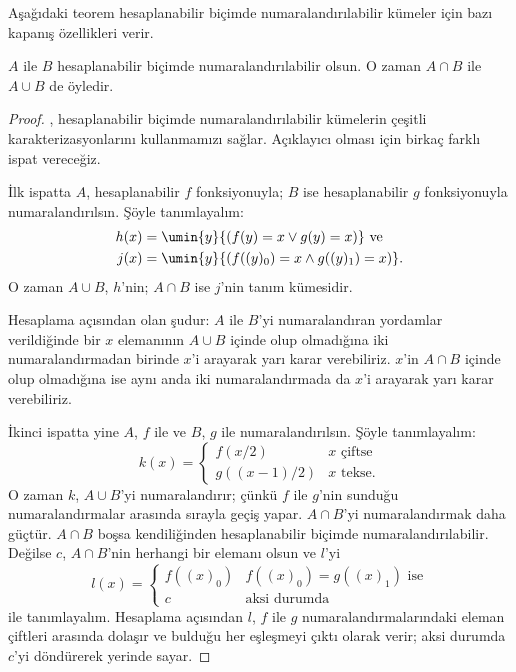 \documentclass[../../../include/open-logic-section]{subfiles}
\begin{document}


Aşağıdaki teorem hesaplanabilir biçimde numaralandırılabilir kümeler için
bazı kapanış özellikleri verir.

\begin{thm}
$A$ ile $B$ hesaplanabilir biçimde numaralandırılabilir olsun. O zaman
$A\cap B$ ile $A\cup B$ de öyledir.
\end{thm}

\begin{proof}
, hesaplanabilir biçimde numaralandırılabilir
kümelerin çeşitli karakterizasyonlarını kullanmamızı sağlar. Açıklayıcı
olması için birkaç farklı ispat vereceğiz.

İlk ispatta $A$, hesaplanabilir $f$ fonksiyonuyla; $B$ ise hesaplanabilir
$g$ fonksiyonuyla numaralandırılsın. Şöyle tanımlayalım:
\begin{align*}
  h(x) & = \umin{y}{(f(y)=x\lor g(y)=x)} \text{ ve}\\
  j(x) & = \umin{y}{(f((y)_0)=x\land g((y)_1)=x)}.
\end{align*}
O zaman $A\cup B$, $h$'nin; $A\cap B$ ise $j$'nin tanım kümesidir.

\begin{explain}
Hesaplama açısından olan şudur: $A$ ile $B$'yi numaralandıran yordamlar
verildiğinde bir $x$ elemanının $A\cup B$ içinde olup olmadığına iki
numaralandırmadan birinde $x$'i arayarak yarı karar verebiliriz. $x$'in
$A\cap B$ içinde olup olmadığına ise aynı anda iki numaralandırmada da
$x$'i arayarak yarı karar verebiliriz.
\end{explain}

İkinci ispatta yine $A$, $f$ ile ve $B$, $g$ ile numaralandırılsın. Şöyle
tanımlayalım:
\[
  k(x)=\begin{cases}
    f(x/2) & \text{$x$ çiftse}\\
    g((x-1)/2) & \text{$x$ tekse.}
  \end{cases}
\]
O zaman $k$, $A\cup B$'yi numaralandırır; çünkü $f$ ile $g$'nin sunduğu
numaralandırmalar arasında sırayla geçiş yapar. $A\cap B$'yi numaralandırmak
daha güçtür. $A\cap B$ boşsa kendiliğinden hesaplanabilir biçimde
numaralandırılabilir. Değilse $c$, $A\cap B$'nin herhangi bir elemanı olsun
ve $l$'yi
\[
  l(x)=\begin{cases}
    f((x)_0) & \text{$f((x)_0)=g((x)_1)$ ise}\\
    c & \text{aksi durumda}
  \end{cases}
\]
ile tanımlayalım. Hesaplama açısından $l$, $f$ ile $g$ numaralandırmalarındaki
eleman çiftleri arasında dolaşır ve bulduğu her eşleşmeyi çıktı olarak verir;
aksi durumda $c$'yi döndürerek yerinde sayar.


\end{proof}
\end{document}

